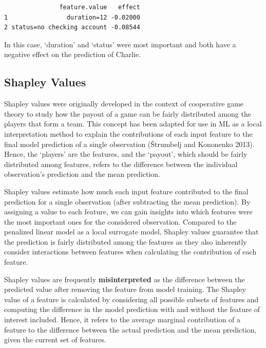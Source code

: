 \begin{verbatim}
               feature.value   effect
1                duration=12 -0.02000
2 status=no checking account -0.08544
\end{verbatim}

In this case, `duration' and `status' were most important and both have
a negative effect on the prediction of Charlie.

\hypertarget{sec-shapley}{%
\subsection{Shapley Values}\label{sec-shapley}}

Shapley values were originally developed in the
context of cooperative game theory to study how the payout of a game can
be fairly distributed among the players that form a team. This concept
has been adapted for use in ML as a local interpretation method to
explain the contributions of each input feature to the final model
prediction of a single observation (Štrumbelj and Kononenko 2013).
Hence, the `players' are the features, and the `payout', which should be
fairly distributed among features, refers to the difference between the
individual observation's prediction and the mean prediction.

Shapley values estimate how much each input feature contributed to the
final prediction for a single observation (after subtracting the mean
prediction). By assigning a value to each feature, we can gain insights
into which features were the most important ones for the considered
observation. Compared to the penalized linear model as a local surrogate
model, Shapley values guarantee that the prediction is fairly
distributed among the features as they also inherently consider
interactions between features when calculating the contribution of each
feature.

\begin{tcolorbox}[enhanced jigsaw, opacitybacktitle=0.6, rightrule=.15mm, opacityback=0, arc=.35mm, breakable, titlerule=0mm, colframe=quarto-callout-warning-color-frame, coltitle=black, bottomrule=.15mm, toprule=.15mm, colback=white, colbacktitle=quarto-callout-warning-color!10!white, bottomtitle=1mm, toptitle=1mm, title=\textcolor{quarto-callout-warning-color}{\faExclamationTriangle}\hspace{0.5em}{Correctly Interpreting Shapley Values}, leftrule=.75mm, left=2mm]

Shapley values are frequently \textbf{misinterpreted} as the difference
between the predicted value after removing the feature from model
training. The Shapley value of a feature is calculated by considering
all possible subsets of features and computing the difference in the
model prediction with and without the feature of interest included.
Hence, it refers to the average marginal contribution of a feature to
the difference between the actual prediction and the mean prediction,
given the current set of features.

\end{tcolorbox}

